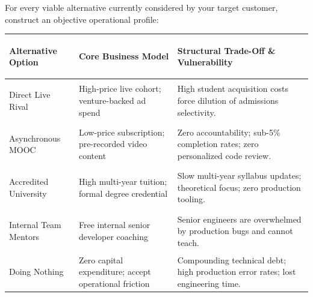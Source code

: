 For every viable alternative currently considered by your target customer, construct an objective operational profile:

\begin{tcolorbox}[
  enhanced,
  colback=BayesSurface!60,
  colframe=BayesBorder,
  boxrule=0.5pt,
  arc=3pt,
  left=3pt,right=3pt,top=3pt,bottom=3pt,
  boxsep=1pt
]
\scriptsize
\begin{tabularx}{\linewidth}{>{\bfseries\raggedright\arraybackslash}p{1.8cm} >{\raggedright\arraybackslash}p{2.2cm} X}
\toprule
\textbf{Alternative Option} & \textbf{Core Business Model} & \textbf{Structural Trade-Off \& Vulnerability} \\
\midrule
Direct Live Rival & High-price live cohort; venture-backed ad spend & High student acquisition costs force dilution of admissions selectivity. \\
\addlinespace[2pt]
Asynchronous MOOC & Low-price subscription; pre-recorded video content & Zero accountability; sub-5\% completion rates; zero personalized code review. \\
\addlinespace[2pt]
Accredited University & High multi-year tuition; formal degree credential & Slow multi-year syllabus updates; theoretical focus; zero production tooling. \\
\addlinespace[2pt]
Internal Team Mentors & Free internal senior developer coaching & Senior engineers are overwhelmed by production bugs and cannot teach. \\
\addlinespace[2pt]
Doing Nothing & Zero capital expenditure; accept operational friction & Compounding technical debt; high production error rates; lost engineering time. \\
\bottomrule
\end{tabularx}
\end{tcolorbox}
